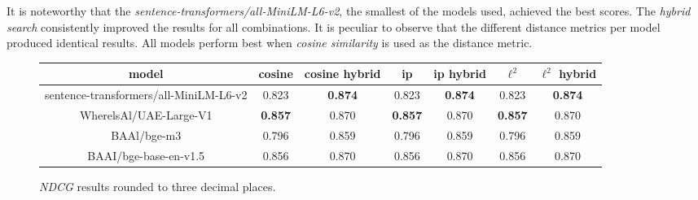 \documentclass{article}
\begin{document}
It is noteworthy that the \textit{sentence-transformers/all-MiniLM-L6-v2}, the smallest of the models used, achieved the best scores. The \textit{hybrid search} consistently improved the results for all combinations. It is peculiar to observe that the different distance metrics per model produced identical results.
All models perform best when \textit{cosine similarity} is used as the distance metric.
\begin{figure}[H]
    \centering
\begin{tabular}{ |c|c|c|c|c|c|c|  }
 \hline

 model& cosine &cosine hybrid&ip&ip hybrid& $\ell^{2}$&$\ell^{2}$ hybrid\\
 \hline
 \hline
 sentence-transformers/all-MiniLM-L6-v2& 0.823&\textbf{0.874}&0.823&\textbf{0.874}&0.823&\textbf{0.874}\\
 \hline
 WherelsAl/UAE-Large-V1& \textbf{0.857}&0.870&\textbf{0.857}&0.870&\textbf{0.857}&0.870\\
 \hline
 BAAl/bge-m3& 0.796&0.859&0.796&0.859&0.796&0.859\\
 \hline
 BAAI/bge-base-en-v1.5& 0.856&0.870&0.856&0.870&0.856&0.870\\
 \hline
\end{tabular}
\caption{\textit{NDCG} results rounded to three decimal places.}
\label{NDCGTable}
\end{figure}
\end{document}
